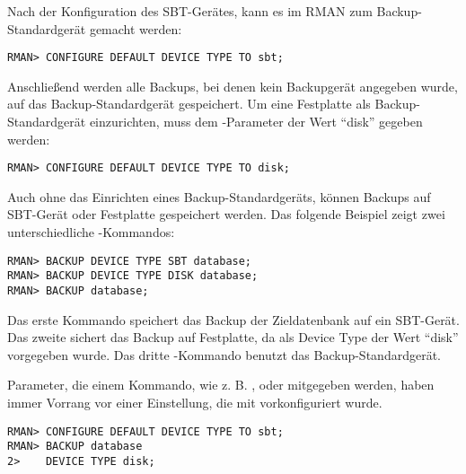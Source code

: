           Nach der Konfiguration des SBT-Gerätes, kann es im RMAN zum Backup-Standardgerät gemacht werden:
          \begin{lstlisting}[caption={Konfigurieren des Backup-Standardgeräts},label=admin1008,language=rman]
RMAN> CONFIGURE DEFAULT DEVICE TYPE TO sbt;
          \end{lstlisting}
          Anschließend werden alle Backups, bei denen kein Backupgerät angegeben wurde, auf das Backup-Standardgerät gespeichert. Um eine Festplatte als Backup-Standardgerät einzurichten, muss dem -Parameter der Wert \enquote{disk} gegeben werden:
          \begin{lstlisting}[caption={Konfigurieren des Backup-Standardgeräts auf Festplatte},label=admin1009,language=rman]
RMAN> CONFIGURE DEFAULT DEVICE TYPE TO disk;
          \end{lstlisting}
          Auch ohne das Einrichten eines Backup-Standardgeräts, können Backups auf SBT-Gerät oder Festplatte gespeichert werden. Das folgende Beispiel zeigt zwei unterschiedliche
          -Kommandos:
          \begin{lstlisting}[caption={Backup-Beispiele},label=admin1010,language=rman]
RMAN> BACKUP DEVICE TYPE SBT database;
RMAN> BACKUP DEVICE TYPE DISK database;
RMAN> BACKUP database;
          \end{lstlisting}
          Das erste Kommando  speichert das Backup der Zieldatenbank auf ein SBT-Gerät. Das zweite sichert das Backup auf Festplatte, da als Device Type der Wert \enquote{disk} vorgegeben wurde. Das dritte -Kommando benutzt das Backup-Standardgerät.
          \begin{merke}
            Parameter, die einem Kommando, wie z. B. ,  oder  mitgegeben werden, haben immer Vorrang vor einer Einstellung, die mit  vorkonfiguriert wurde.
          \end{merke}
          \begin{lstlisting}[caption={Überschreiben einer Konfigurationseinstellungen},label=admin1011,language=rman]
RMAN> CONFIGURE DEFAULT DEVICE TYPE TO sbt;
RMAN> BACKUP database
2>    DEVICE TYPE disk;
          \end{lstlisting}
